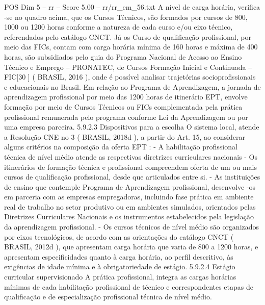 \begin{textsample}{POS Dim 5 – rr – Score 5.00 – rr/rr\_em\_56.txt}  \label{ex:f5_pos_223}
A nível de carga horária, verifica -se no quadro acima, que os Cursos Técnicos, são formados por cursos de 800, 1000 ou 1200 horas conforme a natureza de cada curso e/ou eixo técnico, referendados pelo catálogo CNCT.
Já os Curso de qualificação profissional, por meio das FICs, contam com carga horária mínima de 160 horas e máxima de 400 horas, são subsidiados pelo guia do Programa Nacional de Acesso ao Ensino Técnico e Emprego – PRONATEC, de Cursos Formação Inicial e Continuada – FIC[30 ] ( BRASIL, 2016 ), onde é possível analisar trajetórias socioprofissionais e educacionais no Brasil.
Em relação ao Programa de Aprendizagem, a jornada de aprendizagem profissional por meio das 1200 horas de itinerário EPT, envolve formação por meio de Cursos Técnicos ou FICs complementada pela prática profissional remunerada pelo programa conforme Lei da Aprendizagem ou por uma empresa parceira. 5.9.2.3 Dispositivos para a escolha O sistema local, atende a Resolução CNE no 3 ( BRASIL, 2018d ), a partir do Art. 15, ao considerar alguns critérios na composição da oferta EPT : - A habilitação profissional técnica de nível médio atende as respectivas diretrizes curriculares nacionais - Os itinerários de formação técnica e profissional compreendem oferta de um ou mais cursos de qualificação profissional, desde que articulados entre si. - As instituições de ensino que contemple Programa de Aprendizagem profissional, desenvolve -os em parceria com as empresas empregadoras, incluindo fase prática em ambiente real de trabalho no setor produtivo ou em ambientes simulados, orientados pelas Diretrizes Curriculares Nacionais e os instrumentos estabelecidos pela legislação da aprendizagem profissional. - Os cursos técnicos de nível médio são organizados por eixos tecnológicos, de acordo com as orientações do catálogo CNCT ( BRASIL, 2012d ), que apresentam carga horária que varia de 800 a 1200 horas, e apresentam especificidades quanto à carga horária, ao perfil descritivo, às exigências de idade mínima e à obrigatoriedade de estágio. 5.9.2.4 Estágio curricular supervisionado A prática profissional, integra as cargas horárias mínimas de cada habilitação profissional de técnico e correspondentes etapas de qualificação e de especialização profissional técnica de nível médio.

\end{textsample}
